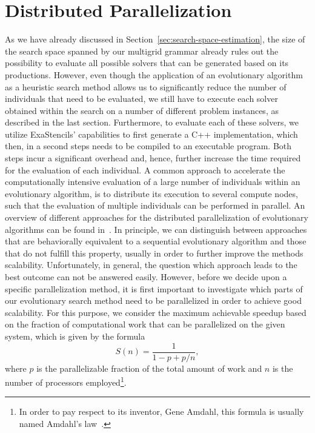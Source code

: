 \section{Distributed Parallelization}
As we have already discussed in Section~\ref{sec:search-space-estimation}, the size of the search space spanned by our multigrid grammar already rules out the possibility to evaluate all possible solvers that can be generated based on its productions.
However, even though the application of an evolutionary algorithm as a heuristic search method allows us to significantly reduce the number of individuals that need to be evaluated, we still have to execute each solver obtained within the search on a number of different problem instances, as described in the last section.
Furthermore, to evaluate each of these solvers, we utilize ExaStencils' capabilities to first generate a C++ implementation, which then, in a second steps needs to be compiled to an executable program.
Both steps incur a significant overhead and, hence, further increase the time required for the evaluation of each individual.
A common approach to accelerate the computationally intensive evaluation of a large number of individuals within an evolutionary algorithm, is to distribute its execution to several compute nodes, such that the evaluation of multiple individuals can be performed in parallel.
An overview of different approaches for the distributed parallelization of evolutionary algorithms can be found in~\cite{gong2015distributed}.
In principle, we can distinguish between approaches that are behaviorally equivalent to a sequential evolutionary algorithm and those that do not fulfill this property, usually in order to further improve the methods scalability.
Unfortunately, in general, the question which approach leads to the best outcome can not be answered easily.
However, before we decide upon a specific parallelization method, it is first important to investigate which parts of our evolutionary search method need to be parallelized in order to achieve good scalability.
For this purpose, we consider the maximum achievable speedup based on the fraction of computational work that can be parallelized on the given system, which is given by the formula
\begin{equation}
	S(n) = \frac{1}{1 - p + p / n},
\end{equation}
where $p$ is the parallelizable fraction of the total amount of work and $n$ is the number of processors employed\footnote{In order to pay respect to its inventor, Gene Amdahl, this formula is usually named Amdahl's law~\cite{amdahl1967validity}.}.
